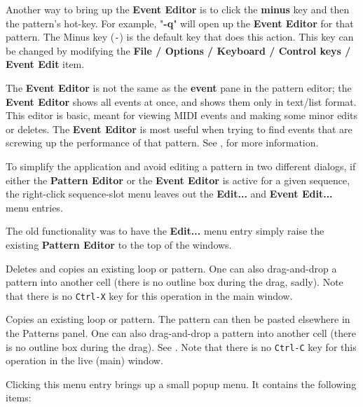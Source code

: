    Another way to bring up the \textbf{Event Editor} is to
   click the \textbf{minus} key and then the pattern's hot-key.
   For example, "\textbf{-q}" will open up the \textbf{Event Editor}
   for that pattern.
   The Minus key (\texttt{-}) is the default key that does this action.
   This key can be changed by modifying the
   \textbf{File / Options / Keyboard / Control keys / Event Edit} item.

   The \textbf{Event Editor}
   is not the same as the \textbf{event} pane in the pattern
   editor; the \textbf{Event Editor} shows all events at once, and shows them
   only in text/list format.  This editor is basic, meant for viewing
   MIDI events and making some minor edits or deletes.
   The \textbf{Event Editor} is most useful when trying to find events
   that are screwing up the performance of that pattern.
   See , for more information.

   To simplify the application and avoid editing a pattern in
   two different dialogs, if either the 
   \textbf{Pattern Editor} or the
   \textbf{Event Editor} is
   active for a given sequence, the right-click sequence-slot menu leaves out
   the \textbf{Edit...} and \textbf{Event Edit...} menu entries.

   The old functionality was to have the \textbf{Edit...} menu entry simply
   raise the existing 
   \textbf{Pattern Editor} to the top of the windows.

   Deletes and copies an existing loop or pattern.
   One can also drag-and-drop a pattern into another cell (there is no outline
   box during the drag, sadly).
   Note that there is no \texttt{Ctrl-X} key for this operation in the
   main window.

%

   Copies an existing loop or pattern.
   The pattern can then be pasted elsewhere in the Patterns panel.
   One can also drag-and-drop a pattern into another cell (there is no outline
   box during the drag).
   See .
   Note that there is no \texttt{Ctrl-C} key for this operation in the
   live (main) window.

   Clicking this menu entry brings up a small popup menu.
   It contains the following items:

